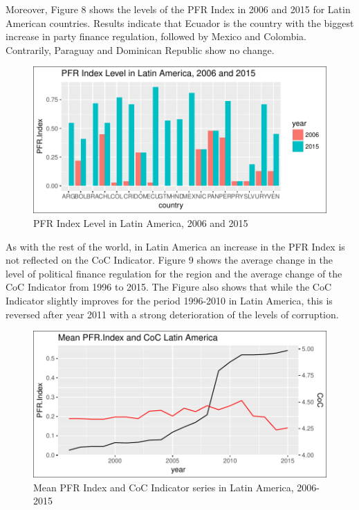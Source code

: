 \documentclass[12,twoside]{article}
\begin{document}
Moreover, Figure 8 shows the levels of the PFR Index in 2006 and 2015
for Latin American countries. Results indicate that Ecuador is the
country with the biggest increase in party finance regulation, followed
by Mexico and Colombia. Contrarily, Paraguay and Dominican Republic show
no change. \pagebreak

\begin{figure}[h]

{\centering \includegraphics{thesis_body_files/figure-latex/figure_viii-1} 

}

\caption{PFR Index Level in Latin America, 2006 and 2015}\label{fig:figure_viii}
\end{figure}

As with the rest of the world, in Latin America an increase in the PFR
Index is not reflected on the CoC Indicator. Figure 9 shows the average
change in the level of political finance regulation for the region and
the average change of the CoC Indicator from 1996 to 2015. The Figure
also shows that while the CoC Indicator slightly improves for the period
1996-2010 in Latin America, this is reversed after year 2011 with a
strong deterioration of the levels of corruption. \pagebreak

\begin{figure}[h]

{\centering \includegraphics{thesis_body_files/figure-latex/figure_ix-1} 

}

\caption{Mean PFR Index and CoC Indicator series in Latin America, 2006-2015}\label{fig:figure_ix}
\end{figure}
\end{document}
